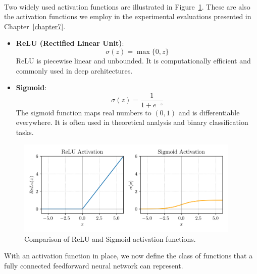 \begin{example} \ \\
Two widely used activation functions are illustrated in
Figure~\ref{fig:activation_functions}. These are also the activation functions
we employ in the experimental evaluations presented in Chapter~\ref{chapter7}.

\begin{itemize}
    \item \textbf{ReLU (Rectified Linear Unit)}:
    \begin{equation*}
        \sigma(z) = \max\{0, z\}
    \end{equation*}
    ReLU is piecewise linear and unbounded. It is computationally efficient and
    commonly used in deep architectures.
    
    \item \textbf{Sigmoid}:
    \begin{equation*}
        \sigma(z) = \frac{1}{1 + e^{-z}}
    \end{equation*}
    The sigmoid function maps real numbers to $(0,1)$ and is differentiable
    everywhere. It is often used in theoretical analysis and binary
    classification tasks.
\end{itemize}
\end{example}

\begin{figure}[H]
  \centering
  \includegraphics[width=0.95\textwidth]{Figures/activations_functions.png}
  \caption{Comparison of ReLU and Sigmoid activation functions.}
  \label{fig:activation_functions}
\end{figure}

With an activation function in place, we now define the class of functions that
a fully connected feedforward neural network can represent.


